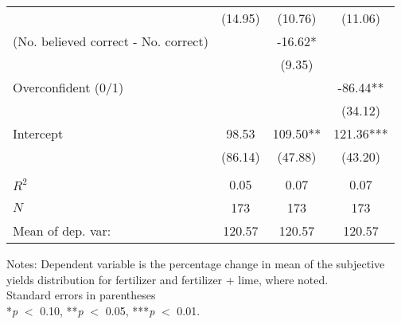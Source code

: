 \begin{table}[htbp]
\begin{threeparttable}
\begin{tabular}{l ccc}
                    &     (14.95)   &     (10.76)   &     (11.06)   \\
(No. believed correct - No. correct)&               &      -16.62*  &               \\
                    &               &      (9.35)   &               \\
Overconfident (0/1) &               &               &      -86.44** \\
                    &               &               &     (34.12)   \\
Intercept           &       98.53   &      109.50** &      121.36***\\
                    &     (86.14)   &     (47.88)   &     (43.20)   \\
                    &               &               &               \\
$R^2$               &        0.05   &        0.07   &        0.07   \\
$N$                 &         173   &         173   &         173   \\
Mean of dep. var:   &      120.57   &      120.57   &      120.57   \\
\hline
\hline
\end{tabular}
\begin{tablenotes}
\footnotesize
\item{Notes: Dependent variable is the percentage change in mean of the subjective yields distribution for fertilizer and fertilizer + lime, where noted. \\ Standard errors in parentheses \\ *\textit{p} $<$ 0.10, **\textit{p} $<$ 0.05, ***\textit{p} $<$ 0.01.}
\end{tablenotes}
\end{threeparttable}
\end{table}
